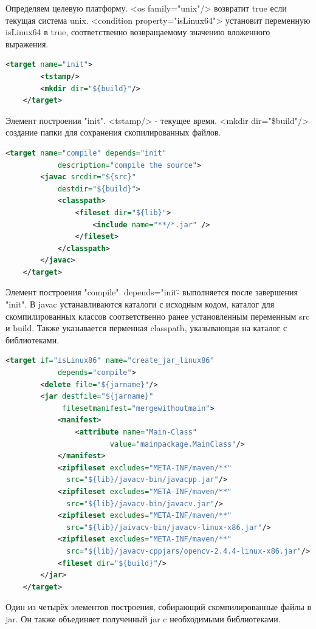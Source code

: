 \documentclass[12pt,a4paper]{extarticle} %
\begin{document}
    Определяем целевую платформу.  <os family="unix"/> возвратит true если текущая система unix.  <condition property="isLinux64"> установит переменную isLinux64 в true, соответственно возвращаемому значению вложенного выражения.
\begin{lstlisting}[language=xml]
    <target name="init">
        <tstamp/>
        <mkdir dir="${build}"/>        
    </target>
\end{lstlisting}

    Элемент построения "init". <tstamp/> - текущее время. <mkdir dir="\${build}"/> создание папки для сохранения скопилированных файлов.
\begin{lstlisting}[language=xml]
    <target name="compile" depends="init" 
            description="compile the source">
        <javac srcdir="${src}" 
            destdir="${build}">
            <classpath>
                <fileset dir="${lib}">
                    <include name="**/*.jar" />
                </fileset>
            </classpath>
        </javac>
    </target>
\end{lstlisting}

    Элемент построения "compile". depends="init\" - выполняется после завершения "init". В javac устанавливаются каталоги с исходным кодом, каталог для скомпилированных классов соответственно ранее установленным переменным src и build. Также указывается перменная classpath, указывающая на каталог с библиотеками.
\begin{lstlisting}[language=xml]
    <target if="isLinux86" name="create_jar_linux86" 
            depends="compile">
        <delete file="${jarname}"/>
        <jar destfile="${jarname}" 
             filesetmanifest="mergewithoutmain">
            <manifest>
                <attribute name="Main-Class" 
                        value="mainpackage.MainClass"/>
            </manifest>
            <zipfileset excludes="META-INF/maven/**" 
              src="${lib}/javacv-bin/javacpp.jar"/>
            <zipfileset excludes="META-INF/maven/**"
              src="${lib}/javacv-bin/javacv.jar"/>
            <zipfileset excludes="META-INF/maven/**" 
              src="${lib}/jaivacv-bin/javacv-linux-x86.jar"/>
            <zipfileset excludes="META-INF/maven/**" 
              src="${lib}/javacv-cppjars/opencv-2.4.4-linux-x86.jar"/>
            <fileset dir="${build}"/>
        </jar>
    </target>
\end{lstlisting}

    Один из четырёх элементов построения, собирающий скомпилированные файлы в jar. Он также объединяет полученный jar c необходимыми библиотеками.
\end{document}
